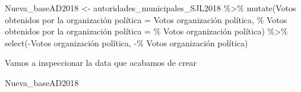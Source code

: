 \documentclass[
]{book}
\newenvironment{Shaded}{\begin{snugshade}}{\end{snugshade}}
\newcommand{\AttributeTok}[1]{\textcolor[rgb]{0.77,0.63,0.00}{#1}}
\newcommand{\FunctionTok}[1]{\textcolor[rgb]{0.00,0.00,0.00}{#1}}
\newcommand{\NormalTok}[1]{#1}
\newcommand{\OtherTok}[1]{\textcolor[rgb]{0.56,0.35,0.01}{#1}}
\newcommand{\SpecialCharTok}[1]{\textcolor[rgb]{0.00,0.00,0.00}{#1}}
\newcommand{\StringTok}[1]{\textcolor[rgb]{0.31,0.60,0.02}{#1}}
\begin{document}
\begin{Shaded}
\begin{Highlighting}[]
\NormalTok{Nueva\_baseAD2018 }\OtherTok{\textless{}{-}}\NormalTok{ autoridades\_municipales\_SJL2018 }\SpecialCharTok{\%\textgreater{}\%} 
  \FunctionTok{mutate}\NormalTok{(}\StringTok{\textasciigrave{}}\AttributeTok{Votos obtenidos por la organización política}\StringTok{\textasciigrave{}} \OtherTok{=} \StringTok{\textasciigrave{}}\AttributeTok{Votos organización política}\StringTok{\textasciigrave{}}\NormalTok{, }\StringTok{\textasciigrave{}}\AttributeTok{\% Votos obtenidos por la organización política}\StringTok{\textasciigrave{}} \OtherTok{=} \StringTok{\textasciigrave{}}\AttributeTok{\% Votos organización política}\StringTok{\textasciigrave{}}\NormalTok{) }\SpecialCharTok{\%\textgreater{}\%}
  \FunctionTok{select}\NormalTok{(}\SpecialCharTok{{-}}\StringTok{\textasciigrave{}}\AttributeTok{Votos organización política}\StringTok{\textasciigrave{}}\NormalTok{, }\SpecialCharTok{{-}}\StringTok{\textasciigrave{}}\AttributeTok{\% Votos organización política}\StringTok{\textasciigrave{}}\NormalTok{)}
\end{Highlighting}
\end{Shaded}

Vamos a inspeccionar la data que acabamos de crear

\begin{Shaded}
\begin{Highlighting}[]
\NormalTok{Nueva\_baseAD2018 }
\end{Highlighting}
\end{Shaded}
\end{document}
